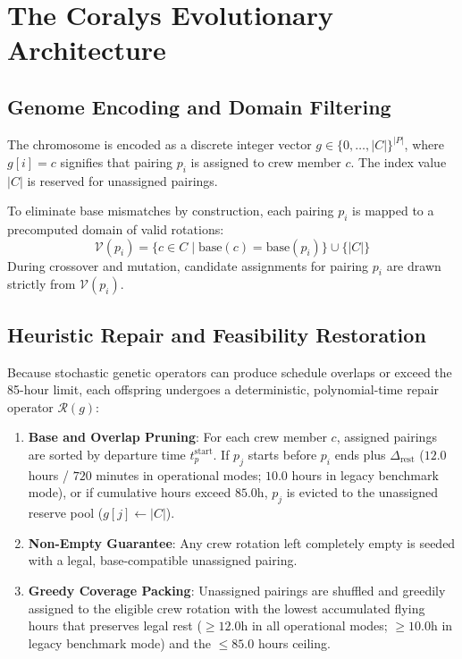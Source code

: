 \documentclass[journal]{IEEEtran}
\begin{document}
\section{The Coralys Evolutionary Architecture}

\subsection{Genome Encoding and Domain Filtering}

The chromosome is encoded as a discrete integer vector $g \in \{0, \dots, |C|\}^{|P|}$, where $g[i] = c$ signifies that pairing $p_i$ is assigned to crew member $c$. The index value $|C|$ is reserved for unassigned pairings. 

To eliminate base mismatches by construction, each pairing $p_i$ is mapped to a precomputed domain of valid rotations:
\begin{equation}
\mathcal{V}(p_i) = \{c \in C \mid \text{base}(c) = \text{base}(p_i)\} \cup \{|C|\}
\end{equation}
During crossover and mutation, candidate assignments for pairing $p_i$ are drawn strictly from $\mathcal{V}(p_i)$.

\subsection{Heuristic Repair and Feasibility Restoration}

Because stochastic genetic operators can produce schedule overlaps or exceed the 85-hour limit, each offspring undergoes a deterministic, polynomial-time repair operator $\mathcal{R}(g)$:
\begin{enumerate}
    \item \textbf{Base and Overlap Pruning}: For each crew member $c$, assigned pairings are sorted by departure time $t^{\text{start}}_p$. If $p_j$ starts before $p_i$ ends plus $\Delta_{\text{rest}}$ ($12.0$ hours / $720$ minutes in operational modes; $10.0$ hours in legacy benchmark mode), or if cumulative hours exceed $85.0$h, $p_j$ is evicted to the unassigned reserve pool ($g[j] \leftarrow |C|$).
    \item \textbf{Non-Empty Guarantee}: Any crew rotation left completely empty is seeded with a legal, base-compatible unassigned pairing.
    \item \textbf{Greedy Coverage Packing}: Unassigned pairings are shuffled and greedily assigned to the eligible crew rotation with the lowest accumulated flying hours that preserves legal rest ($\ge 12.0$h in all operational modes; $\ge 10.0$h in legacy benchmark mode) and the $\le 85.0$ hours ceiling.
\end{enumerate}
\end{document}
